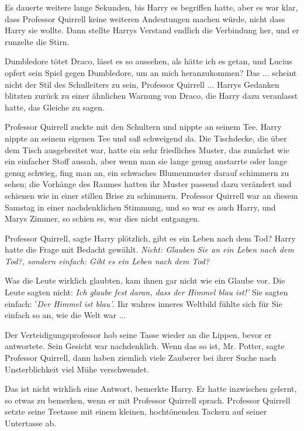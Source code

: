 Es dauerte weitere lange Sekunden, bis Harry es begriffen hatte, aber es war
klar, dass Professor Quirrell keine weiteren Andeutungen machen würde, nicht
dass Harry sie wollte. Dann stellte Harrys Verstand endlich die Verbindung her,
und er runzelte die Stirn.

\glqq{}Dumbledore tötet Draco, lässt es so aussehen, als hätte ich es getan, und
Lucius opfert sein Spiel gegen Dumbledore, um an mich heranzukommen? Das ...
scheint nicht der Stil des Schulleiters zu sein, Professor Quirrell ...\grqq{}
Harrys Gedanken blitzten zurück zu einer ähnlichen Warnung von Draco, die Harry
dazu veranlasst hatte, das Gleiche zu sagen.

Professor Quirrell zuckte mit den Schultern und nippte an seinem Tee. Harry
nippte an seinem eigenen Tee und saß schweigend da. Die Tischdecke, die über dem
Tisch ausgebreitet war, hatte ein sehr friedliches Muster, das zunächst wie ein
einfacher Stoff aussah, aber wenn man sie lange genug anstarrte oder lange genug
schwieg, fing man an, ein schwaches Blumenmuster darauf schimmern zu sehen; die
Vorhänge des Raumes hatten ihr Muster passend dazu verändert und schienen wie in
einer stillen Brise zu schimmern. Professor Quirrell war an diesem Samstag in
einer nachdenklichen Stimmung, und so war es auch Harry, und Marys Zimmer, so
schien es, war dies nicht entgangen.

\glqq{}Professor Quirrell\grqq{}, sagte Harry plötzlich, \glqq{}gibt es ein Leben
nach dem Tod?\grqq{} Harry hatte die Frage mit Bedacht gewählt. \emph{ Nicht: \glqq{}
Glauben Sie an ein Leben nach dem Tod?\grqq{}, sondern einfach: \glqq{}Gibt es
ein Leben nach dem Tod?}

Was die Leute wirklich glaubten, kam ihnen gar nicht wie ein Glaube vor. Die
Leute sagten nicht: \glqq{}\emph{Ich glaube fest daran, dass der Himmel blau
ist!'} Sie sagten einfach: '\emph{Der Himmel ist blau'}. Ihr wahres inneres
Weltbild fühlte sich für Sie einfach so an, wie die Welt war ...

Der Verteidigungsprofessor hob seine Tasse wieder an die Lippen, bevor er
antwortete. Sein Gesicht war nachdenklich. \glqq{}Wenn das so ist, Mr.
Potter\grqq{}, sagte Professor Quirrell, \glqq{}dann haben ziemlich viele
Zauberer bei ihrer Suche nach Unsterblichkeit viel Mühe verschwendet.\grqq{}

\glqq{}Das ist nicht wirklich eine Antwort\grqq{}, bemerkte Harry. Er hatte
inzwischen gelernt, so etwas zu bemerken, wenn er mit Professor Quirrell sprach.
Professor Quirrell setzte seine Teetasse mit einem kleinen, hochtönenden Tackern
auf seiner Untertasse ab.


